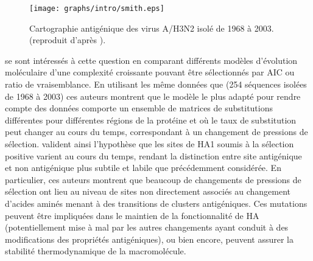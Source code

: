 \begin{figure}[!htbp]
  \begin{center}
    \texttt{[image: graphs/intro/smith.eps]}
  \end{center}
  \caption{Cartographie antigénique des virus A/H3N2 isolé de 1968 à
    2003. (reproduit d'après \citet{Smith2004}).}
  \label{fig:intro:smith}
\end{figure}


\citet{Blackburne2008} se sont intéressés à cette question en
comparant différents modèles d'évolution moléculaire d'une complexité
croissante pouvant être sélectionnés par AIC ou ratio de vraisemblance.
En utilisant les même données que \citet{Smith2004} (254 séquences
isolées de 1968 à 2003) ces auteurs montrent que le modèle le plus
adapté pour rendre compte des données comporte un ensemble de matrices
de substitutions différentes pour différentes régions de la protéine
et où le taux de substitution peut changer au cours du temps,
correspondant à un changement de pressions de sélection.
\citet{Blackburne2008} valident ainsi l'hypothèse que les sites de HA1
soumis à la sélection positive varient au cours du temps, rendant la
distinction entre site antigénique et non antigénique plus subtile et
labile que précédemment considérée. En particulier, ces auteurs
montrent que beaucoup de changements de pressions de sélection ont
lieu au niveau de sites non directement associés au changement
d'acides aminés menant à des transitions de clusters antigéniques. Ces
mutations peuvent être impliquées dans le maintien de la
fonctionnalité de HA (potentiellement mise à mal par les autres
changements ayant conduit à des modifications des propriétés
antigéniques), ou bien encore, peuvent assurer la stabilité
thermodynamique de la macromolécule.


